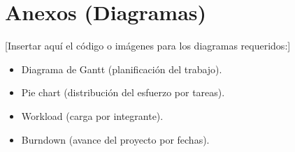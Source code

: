 \documentclass[11pt]{article}
\begin{document}
\section{Anexos (Diagramas)}

[Insertar aquí el código o imágenes para los diagramas requeridos:]
\begin{itemize}
    \item Diagrama de Gantt (planificación del trabajo).
    \item Pie chart (distribución del esfuerzo por tareas).
    \item Workload (carga por integrante).
    \item Burndown (avance del proyecto por fechas).
\end{itemize}
\end{document}
